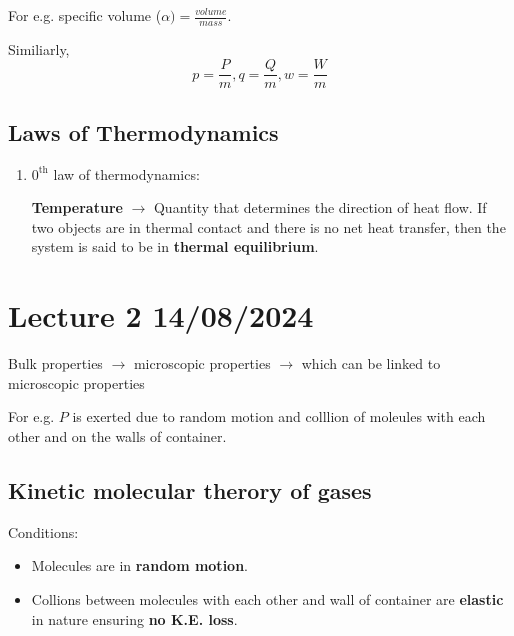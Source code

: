 \documentclass[fleqn,10pt]{SelfArx} %
\begin{document}
For e.g. specific volume ($\alpha) = \frac{volume}{mass}$.

Similiarly, $$p = \frac{P}{m}, q = \frac{Q}{m}, w = \frac{W}{m}$$

\subsection{Laws of Thermodynamics}
\begin{enumerate}
    \item $0^\text{th}$ law of thermodynamics:

    \textbf{Temperature} $\rightarrow$ Quantity that determines the direction of heat flow. If two objects are in thermal contact and there is no net heat transfer, then the system is said to be in \textbf{thermal equilibrium}.
\end{enumerate}


\clearpage
\section{Lecture 2 14/08/2024}

Bulk properties $\rightarrow$ microscopic properties $\rightarrow$ which can be linked to microscopic properties

For e.g. $P$ is exerted due to random motion and colllion of moleules with each other and on the walls of container.

\subsection{Kinetic molecular therory of gases}
Conditions:
\begin{itemize}[noitemsep]
        \item Molecules are in \textbf{random motion}.
        \item Collions between molecules with each other and wall of container are \textbf{elastic} in nature ensuring \textbf{no K.E. loss}.
\end{itemize}
\end{document}
